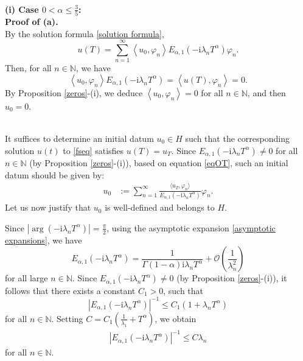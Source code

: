 \documentclass[reqno]{amsart}
\makeatletter
\renewenvironment{proof}[1][\proofname]{\par
  \pushQED{\qed}%
  \normalfont \topsep6\p@\@plus6\p@\relax
  \trivlist
  \item[\hskip\labelsep\bfseries #1\@addpunct{.}]%
}{%
  \popQED\endtrivlist\@endpefalse
}
\numberwithin{equation}{section}
\makeatother
\begin{document}
\begin{proof}\
\\{\bf (i) Case $0<\alpha \le \frac{3}{5}$:}\\
{\bf Proof of (a).}\\
By the solution formula \eqref{solution formula},
$$
u(T)=\sum_{n=1}^{\infty}\left\langle u_0, \varphi_n\right\rangle E_{\alpha, 1}\left(-\mathrm{i}\lambda_n T^\alpha\right) \varphi_n.
$$
Then, for all $n \in \mathbb{N}$, we have
\begin{equation}\label{eqOT}
    \left\langle u_0, \varphi_n\right\rangle E_{\alpha, 1}\left(-\mathrm{i}\lambda_n T^\alpha\right)=\left\langle u(T), \varphi_n\right\rangle=0.
\end{equation}
By Proposition \ref{zeros}-(i), we deduce $\left\langle u_0, \varphi_n\right\rangle=0$ for all $n \in \mathbb{N}$, and then $u_0=0$.
\smallskip

\\
It suffices to determine an initial datum 
	$u_0\in H$ such that the corresponding solution 
	$u(t)$ to \eqref{fseq} satisfies $u(T)=u_T$.  
	Since $E_{\alpha, 1}\left(-\mathrm{i}\lambda_{n} T^{\alpha}\right)\neq 0$ for all $n\in\mathbb{N}$ (by Proposition \ref{zeros}-(i)), based on equation \eqref{eqOT}, such an initial datum should be given by:
	\begin{align*}
		u_0
		&:=\sum_{n=1}^{\infty}\frac{\langle u_T,\varphi_n\rangle}{E_{\alpha, 1}\left(-\mathrm{i}\lambda_n T^\alpha\right)} \varphi_n.
	\end{align*}
	Let us now justify that $u_0$ is well-defined and belongs to $H$.

Since $|\arg(-\mathrm{i}\lambda_{n} T^{\alpha})|=\frac{\pi}{2}$, using the asymptotic expansion \eqref{asymptotic expansions}, we have
$$
E_{\alpha,1}(-\mathrm{i}\lambda_nT^{\alpha}) = \frac{1}{\Gamma(1-\alpha)\mathrm{i}\lambda_nT^{\alpha}}
+ \mathcal{O}\left( \frac{1}{\lambda_n^2}\right)
$$
for all large $n \in \mathbb{N}$. Since $E_{\alpha, 1}\left(-\mathrm{i}\lambda_{n} T^{\alpha}\right)\neq 0$ (by Proposition \ref{zeros}-(i)), it follows that there exists a constant $C_1>0$, such that
$$
\left|E_{\alpha, 1}\left(-\mathrm{i}\lambda_{n} T^{\alpha}\right)\right|^{-1} \le C_1 (1+\lambda_n T^\alpha)
$$
for all $n \in \mathbb{N}$. Setting $C=C_1\left(\frac{1}{\lambda_{1}}+T^\alpha\right)$, we obtain
\begin{align}\label{minora_Mittag}
\left|E_{\alpha, 1}\left(-\mathrm{i}\lambda_{n} T^{\alpha}\right)\right|^{-1} 
\le C\lambda_n
\end{align}
for all $n \in \mathbb{N}$.
    

\end{proof}
\end{document}
